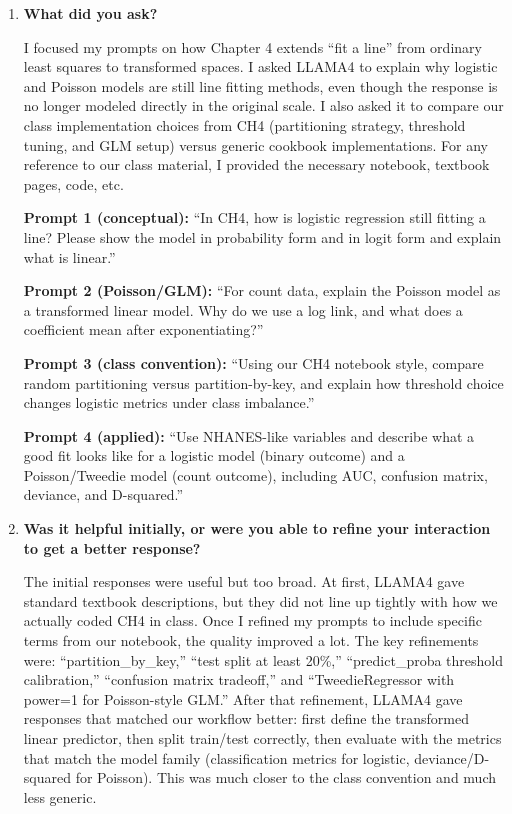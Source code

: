 \documentclass[10pt]{extarticle}
\begin{document}
\begin{enumerate}[label=\arabic*., leftmargin=2em]

\item \textbf{What did you ask?}

I focused my prompts on how Chapter 4 extends ``fit a line'' from ordinary least squares to transformed spaces. I asked LLAMA4 to explain why logistic and Poisson models are still line fitting methods, even though the response is no longer modeled directly in the original scale. I also asked it to compare our class implementation choices from CH4 (partitioning strategy, threshold tuning, and GLM setup) versus generic cookbook implementations. For any reference to our class material, I provided the necessary notebook, textbook pages, code, etc.

\noindent\textbf{Prompt 1 (conceptual):} ``In CH4, how is logistic regression still fitting a line? Please show the model in probability form and in logit form and explain what is linear.''

\noindent\textbf{Prompt 2 (Poisson/GLM):} ``For count data, explain the Poisson model as a transformed linear model. Why do we use a log link, and what does a coefficient mean after exponentiating?''

\noindent\textbf{Prompt 3 (class convention):} ``Using our CH4 notebook style, compare random partitioning versus partition-by-key, and explain how threshold choice changes logistic metrics under class imbalance.''

\noindent\textbf{Prompt 4 (applied):} ``Use NHANES-like variables and describe what a good fit looks like for a logistic model (binary outcome) and a Poisson/Tweedie model (count outcome), including AUC, confusion matrix, deviance, and D-squared.''


\item \textbf{Was it helpful initially, or were you able to refine your interaction to get a better response?}

The initial responses were useful but too broad. At first, LLAMA4 gave standard textbook descriptions, but they did not line up tightly with how we actually coded CH4 in class. Once I refined my prompts to include specific terms from our notebook, the quality improved a lot. The key refinements were: ``partition\_by\_key,'' ``test split at least 20\%,'' ``predict\_proba threshold calibration,'' ``confusion matrix tradeoff,'' and ``TweedieRegressor with power=1 for Poisson-style GLM.'' After that refinement, LLAMA4 gave responses that matched our workflow better: first define the transformed linear predictor, then split train/test correctly, then evaluate with the metrics that match the model family (classification metrics for logistic, deviance/D-squared for Poisson). This was much closer to the class convention and much less generic.


\end{enumerate}
\end{document}
